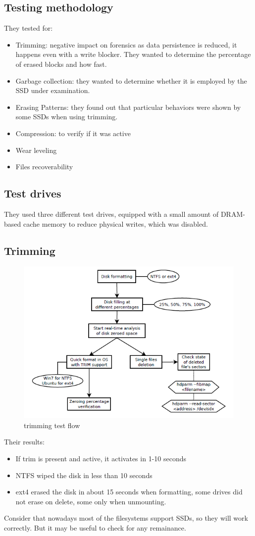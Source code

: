     \subsection{Testing methodology}
        They tested for:
        \begin{itemize}
            \item Trimming: negative impact on forensics as data persistence is reduced, it happens even with a write blocker. They wanted to determine the percentage of erased blocks and how fast.
            \item Garbage collection: they wanted to determine whether it is employed by the SSD under examination.
            \item Erasing Patterns: they found out that particular behaviors were shown by some SSDs when using trimming.
            \item Compression: to verify if it was active
            \item Wear leveling
            \item Files recoverability 
        \end{itemize}
    \subsection{Test drives}
        They used three different test drives, equipped with a small amount of DRAM-based cache memory to reduce physical writes, which was disabled.
    \subsection{Trimming}
        \begin{figure}[ht!]
            \centering
            \includegraphics[width=0.5\linewidth]{trim.png}
            \caption{trimming test flow}
        \end{figure}
        Their results:
        \begin{itemize}
            \item If trim is present and active, it activates in 1-10 seconds 
            \item NTFS wiped the disk in less than 10 seconds 
            \item ext4 erased the disk in about 15 seconds when formatting, some drives did not erase on delete, some only when unmounting.
        \end{itemize}
        Consider that nowadays most of the filesystems support SSDs, so they will work correctly. But it may be useful to check for any remainance.
    \newpage
